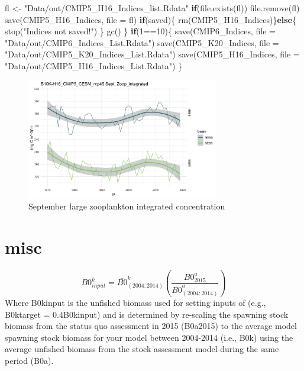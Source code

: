 \documentclass[
]{article}
\newenvironment{Shaded}{\begin{snugshade}}{\end{snugshade}}
\newcommand{\AttributeTok}[1]{\textcolor[rgb]{0.77,0.63,0.00}{#1}}
\newcommand{\ControlFlowTok}[1]{\textcolor[rgb]{0.13,0.29,0.53}{\textbf{#1}}}
\newcommand{\DecValTok}[1]{\textcolor[rgb]{0.00,0.00,0.81}{#1}}
\newcommand{\FunctionTok}[1]{\textcolor[rgb]{0.00,0.00,0.00}{#1}}
\newcommand{\NormalTok}[1]{#1}
\newcommand{\OtherTok}[1]{\textcolor[rgb]{0.56,0.35,0.01}{#1}}
\newcommand{\SpecialCharTok}[1]{\textcolor[rgb]{0.00,0.00,0.00}{#1}}
\newcommand{\StringTok}[1]{\textcolor[rgb]{0.31,0.60,0.02}{#1}}
\begin{document}
\begin{Shaded}
\begin{Highlighting}[]
\NormalTok{      fl }\OtherTok{\textless{}{-}} \StringTok{"Data/out/CMIP5\_H16\_Indices\_list.Rdata"}
      \ControlFlowTok{if}\NormalTok{(}\FunctionTok{file.exists}\NormalTok{(fl)) }\FunctionTok{file.remove}\NormalTok{(fl)}
      \FunctionTok{save}\NormalTok{(CMIP5\_H16\_Indices, }\AttributeTok{file =}\NormalTok{ fl)}
      \ControlFlowTok{if}\NormalTok{(saved)\{}
        \FunctionTok{rm}\NormalTok{(CMIP5\_H16\_Indices)\}}\ControlFlowTok{else}\NormalTok{\{}
          \FunctionTok{stop}\NormalTok{(}\StringTok{"Indices not saved!"}\NormalTok{)}
\NormalTok{        \}}
      \FunctionTok{gc}\NormalTok{()}
\NormalTok{    \}}
    \ControlFlowTok{if}\NormalTok{(}\DecValTok{1}\SpecialCharTok{==}\DecValTok{10}\NormalTok{)\{}
      \FunctionTok{save}\NormalTok{(CMIP6\_Indices, }\AttributeTok{file =} \StringTok{"Data/out/CMIP6\_Indices\_List.Rdata"}\NormalTok{)}
      \FunctionTok{save}\NormalTok{(CMIP5\_K20\_Indices, }\AttributeTok{file =} \StringTok{"Data/out/CMIP5\_K20\_Indices\_List.Rdata"}\NormalTok{)}
      \FunctionTok{save}\NormalTok{(CMIP5\_H16\_Indices, }\AttributeTok{file =} \StringTok{"Data/out/CMIP5\_H16\_Indices\_List.Rdata"}\NormalTok{)}
\NormalTok{    \}}
\end{Highlighting}
\end{Shaded}

\begin{figure}
\centering
\includegraphics[width=0.75\textwidth,height=\textheight]{Figs/Hind_Sept_large_Zoop.jpg}
\caption{September large zooplankton integrated concentration}
\end{figure}

\hypertarget{misc}{%
\section{misc}\label{misc}}

\[B0^k_{input}= \bar{B0}^k_{(2004:2014)}\left(\frac{B0^{a}_{2015}}{\bar{B0}^a_{(2004:2014)}}\right) \]
Where B0kinput is the unfished biomass used for setting inputs of (e.g.,
B0ktarget = 0.4B0kinput) and is determined by re-scaling the spawning
stock biomass from the status quo assessment in 2015 (B0a2015) to the
average model spawning stock biomass for your model between 2004-2014
(i.e., B0k) using the average unfished biomass from the stock assessment
model during the same period (B0a).
\end{document}

